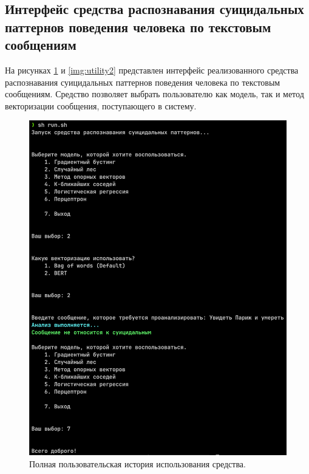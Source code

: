 \subsection{Интерфейс средства распознавания суицидальных паттернов поведения человека по текстовым сообщениям}

На рисунках \ref{img:utility1} и \ref{img:utility2} представлен интерфейс реализованного средства распознавания суицидальных паттернов поведения человека по текстовым сообщениям. Средство позволяет выбрать пользователю как модель, так и метод векторизации сообщения, поступающего в систему.

\begin{figure}[H]
	\centering
	\includegraphics[width=\textwidth]{inc/utility1.png}
	\caption{ Полная пользовательская история использования средства. }
	\label{img:utility1}
\end{figure}

